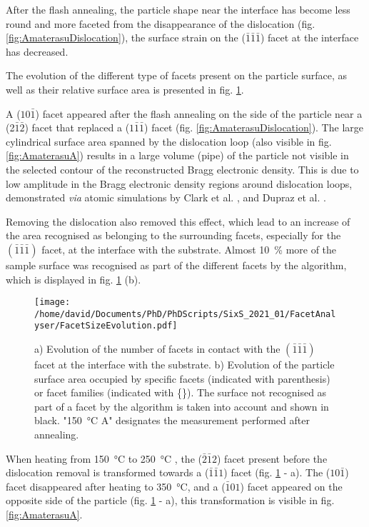 After the flash annealing, the particle shape near the interface has become less round and more faceted from the disappearance of the dislocation (fig. \ref{fig:AmaterasuDislocation}), the surface strain on the ($\bar{1}\bar{1}\bar{1}$) facet at the interface has decreased.

The evolution of the different type of facets present on the particle surface, as well as their relative surface area is presented in fig. \ref{fig:AmaterasuFacetsEvolution}.

A ($10\bar{1}$) facet appeared after the flash annealing on the side of the particle near a (2$\bar{1}\bar{2}$) facet that replaced a ($1\bar{1}\bar{1}$) facet (fig. \ref{fig:AmaterasuDislocation}).
The large cylindrical surface area spanned by the dislocation loop (also visible in fig. \ref{fig:AmaterasuA}) results in a large volume (pipe) of the particle not visible in the selected contour of the reconstructed Bragg electronic density.
This is due to low amplitude in the Bragg electronic density regions around dislocation loops, demonstrated \textit{via} atomic simulations by Clark et al. \parencite*{Clark2015}, and Dupraz et al. \parencite*{Dupraz2017}.

Removing the dislocation also removed this effect, which lead to an increase of the area recognised as belonging to the surrounding facets, especially for the $(\bar{1}\bar{1}\bar{1})$ facet, at the interface with the substrate.
Almost \qty{10}{\percent} more of the sample surface was recognised as part of the different facets by the algorithm, which is displayed in fig. \ref{fig:AmaterasuFacetsEvolution} (b).

\begin{figure}[!htb]
    \centering
    \texttt{[image: /home/david/Documents/PhD/PhDScripts/SixS\_2021\_01/FacetAnalyser/FacetSizeEvolution.pdf]}
    \caption{
        a) Evolution of the number of facets in contact with the $(\bar{1}\bar{1}\bar{1})$ facet at the interface with the substrate.
        b) Evolution of the particle surface area occupied by specific facets (indicated with parenthesis) or facet families (indicated with \{\}).
        The surface not recognised as part of a facet by the algorithm is taken into account and shown in black.
        "\qty{150}{\degreeCelsius} A" designates the measurement performed after annealing.
    }
    \label{fig:AmaterasuFacetsEvolution}
\end{figure}

When heating from \qty{150}{\degreeCelsius} to \qty{250}{\degreeCelsius} , the ($\bar{2}\bar{1}2$) facet present before the dislocation removal is transformed towards a ($\bar{1}\bar{1}1$) facet (fig. \ref{fig:AmaterasuFacetsEvolution} - a).
The ($10\bar{1}$) facet disappeared after heating to \qty{350}{\degreeCelsius}, and a ($\bar{1}01$) facet appeared on the opposite side of the particle (fig. \ref{fig:AmaterasuFacetsEvolution} - a), this transformation is visible in fig. \ref{fig:AmaterasuA}.

